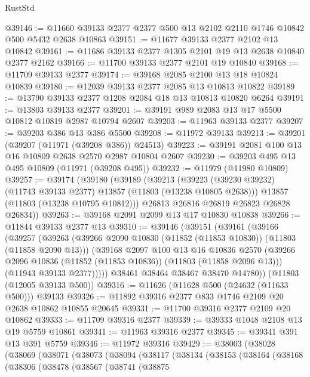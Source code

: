 \begin{lexlean}{RustStd}
\begin{coremodule}
@39146 := @11660 @39133 @2377 @2377 @500 @13 @2102 @2110 @1746 @10842 @500 @5432 @2638 @10863
@39151 := @11677 @39133 @2377 @2102 @13 @10842
@39161 := @11686 @39133 @2377 @1305 @2101 @19 @13 @2638 @10840 @2377 @2162
@39166 := @11700 @39133 @2377 @2101 @19 @10840
@39168 := @11709 @39133 @2377
@39174 := @39168 @2085 @2100 @13 @18 @10824 @10839
@39180 := @12039 @39133 @2377 @2085 @13 @10813 @10822
@39189 := @13790 @39133 @2377 @1208 @2084 @18 @13 @10813 @10820 @6264
@39191 := @13803 @39133 @2377
@39201 := @39191 @989 @2083 @13 @17 @5500 @10812 @10819 @2987 @10794 @2607
@39203 := @11963 @39133 @2377
@39207 := @39203 @386 @13 @386 @5500
@39208 := @11972 @39133
@39213 := @39201 (@39207 (@11971 (@39208 @386)) @24513)
@39223 := @39191 @2081 @100 @13 @16 @10809 @2638 @2570 @2987 @10804 @2607
@39230 := @39203 @495 @13 @495 @10809 (@11971 (@39208 @495))
@39232 := @11979 (@11980 @10809)
@39257 := @39174
    (@39180
      (@39189
        (@39213
          (@39223 (@39230 @39232) (@11743 @39133 @2377) @13857 (@11803 (@13238 @10805 @2638)))
          @13857
          (@11803 (@13238 @10795 @10812)))
        @26813
        @26816
        @26819
        @26823
        @26828
        @26834))
@39263 := @39168 @2091 @2099 @13 @17 @10830 @10838
@39266 := @11844 @39133 @2377 @13
@39310 := @39146
    (@39151
      (@39161
        (@39166
          (@39257
            (@39263
              (@39266 @2090 @10830 (@11852 (@11853 @10830)) (@11803 (@11858 @2090 @13)))
              (@39168
                @2097
                @100
                @13
                @16
                @10836
                @2570
                (@39266 @2096 @10836 (@11852 (@11853 @10836)) (@11803 (@11858 @2096 @13)))
                (@11943 @39133 @2377)))))
        @38461
        @38464
        @38467
        @38470
        @14780))
    (@11803 (@12005 @39133 @500))
@39316 := @11626 (@11628 @500 (@24632 (@11633 @500))) @39133
@39326 := @11892 @39316 @2377 @833 @1746 @2109 @20 @2638 @10862 @10855 @20645
@39331 := @11700 @39316 @2377 @2109 @20 @10862
@39333 := @11709 @39316 @2377
@39339 := @39333 @1048 @2108 @13 @19 @5759 @10861
@39341 := @11963 @39316 @2377
@39345 := @39341 @391 @13 @391 @5759
@39346 := @11972 @39316
@39429 := @38003
    (@38028
      (@38069
        (@38071
          (@38073
            (@38094
              (@38117
                (@38134
                  (@38153
                    (@38164
                      (@38168
                        (@38306
                          (@38478
                            (@38567
                              (@38741
                                (@38875

\end{coremodule}
\end{lexlean}

